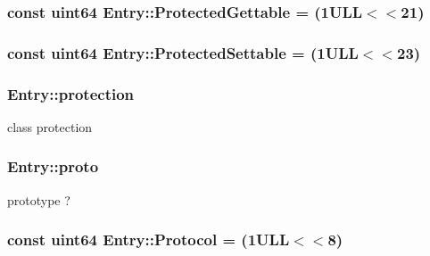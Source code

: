 \subsubsection[{Protected\+Gettable}]{\setlength{\rightskip}{0pt plus 5cm}const {\bf uint64} Entry\+::\+Protected\+Gettable = (1\+U\+L\+L$<$$<$21)\hspace{0.3cm}{\ttfamily [static]}}\label{class_entry_aa923493681980b707bfce77996f21268}
\hypertarget{class_entry_a5483d74642fe0e648e4c5661921bf7f0}{}
\subsubsection[{Protected\+Settable}]{\setlength{\rightskip}{0pt plus 5cm}const {\bf uint64} Entry\+::\+Protected\+Settable = (1\+U\+L\+L$<$$<$23)\hspace{0.3cm}{\ttfamily [static]}}\label{class_entry_a5483d74642fe0e648e4c5661921bf7f0}
\hypertarget{class_entry_acbb1b4e99978a710863cf9cab6c90553}{}
\subsubsection[{protection}]{ Entry\+::protection}\label{class_entry_acbb1b4e99978a710863cf9cab6c90553}


class protection 

\hypertarget{class_entry_a14c9abc36afe46d02521ef846e6bcc27}{}
\subsubsection[{proto}]{ Entry\+::proto}\label{class_entry_a14c9abc36afe46d02521ef846e6bcc27}


prototype ? 

\hypertarget{class_entry_a3a84b60a59e7bc7cb2d1b71e3be16d80}{}
\subsubsection[{Protocol}]{\setlength{\rightskip}{0pt plus 5cm}const {\bf uint64} Entry\+::\+Protocol = (1\+U\+L\+L$<$$<$8)\hspace{0.3cm}{\ttfamily [static]}}\label{class_entry_a3a84b60a59e7bc7cb2d1b71e3be16d80}
\hypertarget{class_entry_a2dffe3090d7636a879832be07aec6a0a}{}
